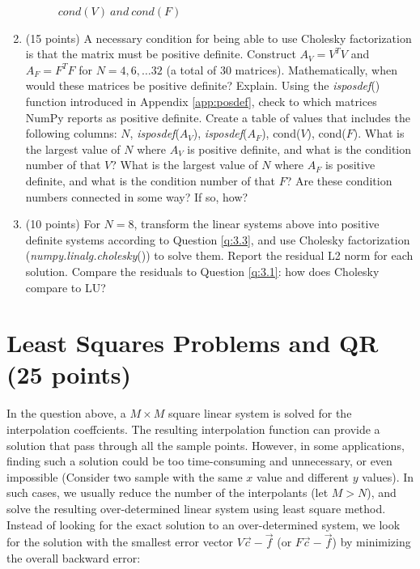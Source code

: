 \documentclass[10pt]{article}
\begin{document}
\begin{enumerate}[label=3.\arabic*]
\begin{figure}[H]
   	\caption{$cond(V)\ and\ cond(F)$}
    \end{figure}
    \item (15 points) \label{q:3.3}
    A necessary condition for being able to use Cholesky factorization is that the matrix must be positive definite. 
    Construct $A_V = V^TV$ and $A_F = F^TF$ for $N = 4, 6, \dots32$ (a total of 30 matrices). 
    Mathematically, when would these matrices be positive definite? Explain.
    Using the \textit{isposdef}() function introduced in Appendix \ref{app:posdef}, check to which matrices NumPy reports as positive definite. Create a table of values that includes the following columns: $N$, \textit{isposdef}($A_V$), \textit{isposdef}($A_F$), cond($V$), cond($F$).
    What is the largest value of $N$ where $A_V$ is positive definite, and what is the condition number of that $V$? 
    What is the largest value of $N$ where $A_F$ is positive definite, and what is the condition number of that $F$? 
    Are these condition numbers connected in some way? If so, how?
    
    \item (10 points)
    For $N = 8$, transform the linear systems above into positive definite systems according to Question \ref{q:3.3}, and use Cholesky factorization (\textit{numpy.linalg.cholesky}()) to solve them. Report the residual L2 norm for each solution. Compare the residuals to Question \ref{q:3.1}: how does Cholesky compare to LU?


\end{enumerate}


\section{Least Squares Problems and QR (25 points)}\label{sec:lin_lsp}

In the question above, a $M\times M$ square linear system is solved for the interpolation coeffcients.
The resulting interpolation function can provide a solution that pass through all the sample points.
However, in some applications, finding such a solution could be too time-consuming and unnecessary, or even impossible (Consider two sample with the same $x$ value and different $y$ values).
In such cases, we usually reduce the number of the interpolants (let $M>N$), and solve the resulting over-determined linear system using least square method.
Instead of looking for the exact solution to an over-determined system, we look for the solution with the smallest error vector $V\vec{c}-\vec{f}$ (or $F\vec{c}-\vec{f}$) by minimizing the overall backward error:
\end{document}
